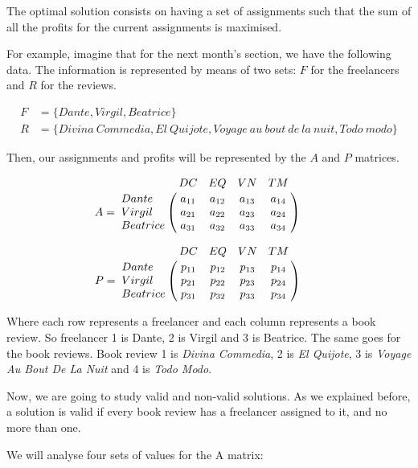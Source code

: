 The optimal solution consists on having a set of assignments such that the sum of all the profits for the current assignments is maximised.

For example, imagine that for the next month's section, we have the following data. The information is represented by means of two sets: $F$ for the freelancers and $R$ for the reviews.

\begin{align}
    F &= \{ Dante, Virgil, Beatrice \} \\
    R &= \{ {Divina\ Commedia}, {El\ Quijote}, {Voyage\ au\ bout\ de\ la\ nuit}, {Todo\ modo} \}
\end{align}

Then, our assignments and profits will be represented by the $A$ and $P$ matrices.

\begin{equation}
    A = \bordermatrix{
        & DC & EQ & VN & TM \cr
        Dante & a_{11} & a_{12} & a_{13} & a_{14} \cr
        Virgil & a_{21} & a_{22} & a_{23} & a_{24} \cr
        Beatrice & a_{31} & a_{32} & a_{33} & a_{34} 
    } \qquad
\end{equation}

\begin{equation}
    P = \bordermatrix{
        & DC & EQ & VN & TM \cr
        Dante & p_{11} & p_{12} & p_{13} & p_{14}\cr 
        Virgil & p_{21} & p_{22} & p_{23} & p_{24}\cr 
        Beatrice & p_{31} & p_{32} & p_{33} & p_{34} 
    } \qquad
\end{equation}

Where each row represents a freelancer and each column represents a book review. So freelancer 1 is Dante, 2 is Virgil and 3 is Beatrice. The same goes for the book reviews. Book review 1 is \textit{Divina Commedia}, 2 is \textit{El Quijote}, 3 is \textit{Voyage Au Bout De La Nuit} and 4 is \textit{Todo Modo}.

Now, we are going to study valid and non-valid solutions. As we explained before, a solution is valid if every book review has a freelancer assigned to it, and no more than one.

We will analyse four sets of values for the A matrix:

